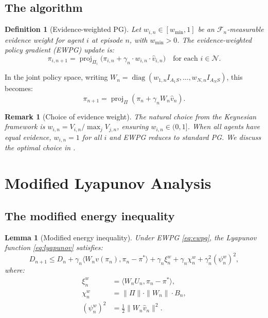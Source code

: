 \documentclass[11pt,a4paper]{article}
\newtheorem{lemma}[theorem]{Lemma}
\newtheorem{definition}[theorem]{Definition}
\newtheorem{remark}[theorem]{Remark}
\DeclareMathOperator{\proj}{proj}
\DeclareMathOperator{\diag}{diag}
\newcommand{\cF}{\mathcal{F}}
\newcommand{\ip}[2]{\langle #1, #2 \rangle}
\begin{document}
\subsection{The algorithm}

\begin{definition}[Evidence-weighted PG]
\label{def:ewpg}
Let $w_{i,n} \in [w_{\min}, 1]$ be an $\cF_n$-measurable \emph{evidence weight} for agent $i$ at episode $n$, with $w_{\min} > 0$. The \emph{evidence-weighted policy gradient} (EWPG) update is:
\begin{equation}
\label{eq:ewpg}
\tag{EWPG}
    \pi_{i,n+1} = \proj_{\Pi_i}\bigl(\pi_{i,n} + \gamma_n \cdot w_{i,n} \cdot \hat{v}_{i,n}\bigr) \quad \text{for each } i \in \mathcal{N}.
\end{equation}
\end{definition}

In the joint policy space, writing $W_n = \diag(w_{1,n} I_{A_1 S}, \ldots, w_{N,n} I_{A_N S})$, this becomes:
\begin{equation}
    \pi_{n+1} = \proj_\Pi(\pi_n + \gamma_n W_n \hat{v}_n).
\end{equation}

\begin{remark}[Choice of evidence weight]
\label{rem:weight-choice}
The natural choice from the Keynesian framework is $w_{i,n} = V_{i,n} / \max_j V_{j,n}$, ensuring $w_{i,n} \in (0, 1]$. When all agents have equal evidence, $w_{i,n} = 1$ for all $i$ and EWPG reduces to standard PG. We discuss the optimal choice in .
\end{remark}


\section{Modified Lyapunov Analysis}
\label{sec:lyapunov}

\subsection{The modified energy inequality}

\begin{lemma}[Modified energy inequality]
\label{lem:energy}
Under EWPG \eqref{eq:ewpg}, the Lyapunov function \eqref{eq:lyapunov} satisfies:
\begin{equation}
\label{eq:energy-ewpg}
\boxed{
    D_{n+1} \leq D_n + \gamma_n \ip{W_n v(\pi_n)}{\pi_n - \pi^*} + \gamma_n \xi_n^w + \gamma_n \chi_n^w + \gamma_n^2 (\psi_n^w)^2,
}
\end{equation}
where:
\begin{align}
    \xi_n^w &= \ip{W_n U_n}{\pi_n - \pi^*}, \label{eq:xi-w} \\
    \chi_n^w &= \|\Pi\| \cdot \|W_n\| \cdot B_n, \label{eq:chi-w} \\
    (\psi_n^w)^2 &= \tfrac{1}{2}\|W_n \hat{v}_n\|^2. \label{eq:psi-w}
\end{align}
\end{lemma}
\end{document}
